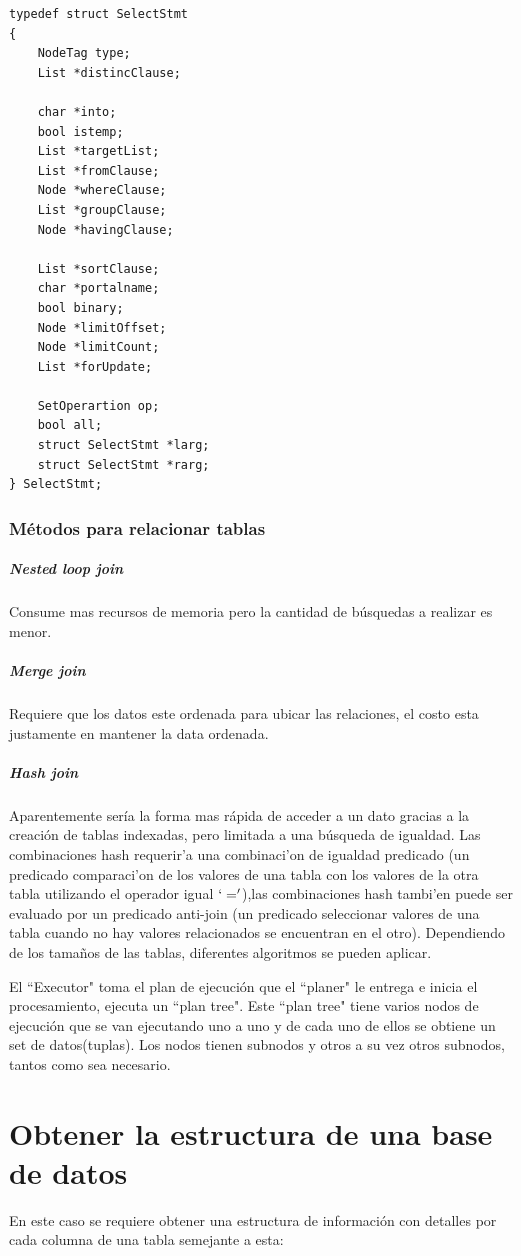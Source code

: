 \lstset{language=c,breaklines=true}
\begin{lstlisting}
typedef struct SelectStmt
{
	NodeTag	type;
	List *distincClause;
	
	char *into;
	bool istemp;
	List *targetList;
	List *fromClause;
	Node *whereClause;
	List *groupClause;
	Node *havingClause;
	
	List *sortClause;
	char *portalname;
	bool binary;
	Node *limitOffset;
	Node *limitCount;
	List *forUpdate;
	
	SetOperartion op;
	bool all;
	struct SelectStmt *larg;
	struct SelectStmt *rarg;		
} SelectStmt;	
\end{lstlisting}

\subsubsection{M\'etodos para relacionar tablas}
\subparagraph{Nested loop join}
Consume mas recursos de memoria pero la cantidad de b\'usquedas a realizar es menor.
\subparagraph{Merge join}
Requiere que los datos este ordenada para ubicar las relaciones, el costo esta justamente en mantener la data ordenada.
\subparagraph{Hash join}
Aparentemente ser\'ia la forma mas r\'apida de acceder a un dato gracias a la creaci\'on de tablas indexadas, pero limitada a una b\'usqueda de igualdad. Las combinaciones hash requerir'a una combinaci'on de igualdad predicado (un predicado comparaci'on de los valores de una tabla con los valores de la otra tabla utilizando el operador igual $`='$),las combinaciones hash tambi'en puede ser evaluado por un predicado anti-join (un predicado seleccionar valores de una tabla cuando no hay valores relacionados se encuentran en el otro). Dependiendo de los tama\~nos de las tablas, diferentes algoritmos se pueden aplicar.

El ``Executor" toma el plan de ejecuci\'on que el ``planer" le entrega e inicia el procesamiento, ejecuta un ``plan tree".
Este ``plan tree" tiene varios nodos de ejecuci\'on que se van ejecutando uno a uno y de cada uno de ellos se obtiene un set de datos(tuplas). Los nodos tienen subnodos y otros a su vez otros subnodos, tantos como sea necesario.
\section{Obtener la estructura de una base de datos}
En este caso se requiere obtener una estructura de informaci\'on con detalles por cada columna de una tabla semejante a esta:

